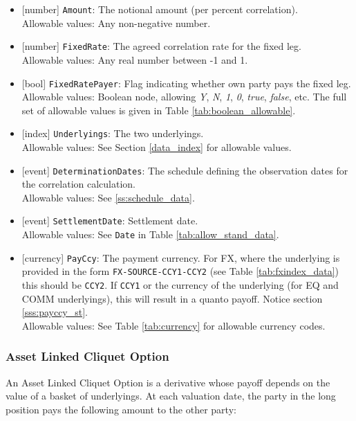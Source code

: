 \begin{itemize} 
  \item{}[number] \lstinline!Amount!: The notional amount (per percent correlation). \\
  Allowable values: Any non-negative number.
  \item{}[number] \lstinline!FixedRate!: The agreed correlation rate for the fixed leg. \\
  Allowable values: Any real number between -1 and 1.
  \item{}[bool] \lstinline!FixedRatePayer!: Flag indicating whether own party pays the fixed leg. \\
  Allowable values: Boolean node, allowing \emph{Y}, \emph{N}, \emph{1}, \emph{0}, \emph{true}, \emph{false}, etc.
  The full set of allowable values is given in Table \ref{tab:boolean_allowable}.
  \item{}[index] \lstinline!Underlyings!: The two underlyings. \\
  Allowable values: See Section \ref{data_index} for allowable values.
  \item{}[event] \lstinline!DeterminationDates!: The schedule defining the observation dates for the correlation calculation. \\
  Allowable values: See \ref{ss:schedule_data}.
  \item{}[event] \lstinline!SettlementDate!: Settlement date. \\
  Allowable values: See \lstinline!Date! in Table \ref{tab:allow_stand_data}.
  \item{}[currency] \lstinline!PayCcy!: The payment currency. For FX, where the underlying is provided
      in the form \lstinline!FX-SOURCE-CCY1-CCY2! (see Table \ref{tab:fxindex_data}) this should
      be \lstinline!CCY2!. If \lstinline!CCY1! or the currency of the underlying (for EQ and
      COMM underlyings), this will result in a quanto payoff. Notice section \ref{sss:payccy_st}. \\
        Allowable values: See Table \ref{tab:currency} for allowable currency codes.
\end{itemize}

\subsubsection{Asset Linked Cliquet Option}


An Asset Linked Cliquet Option is a derivative whose payoff depends on the value of a basket
of underlyings. At each valuation date, the party in the long position pays the following amount to the other party:

